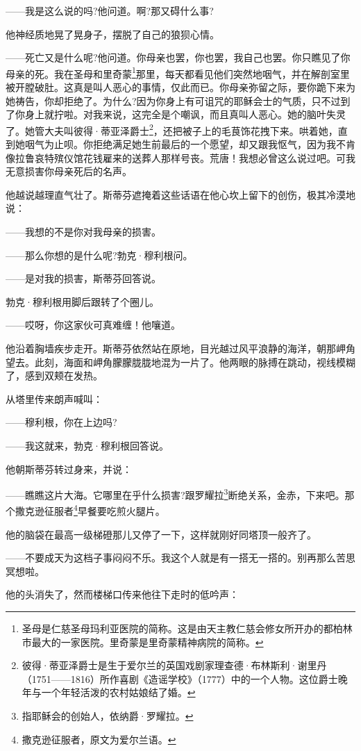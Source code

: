 \par ——我是这么说的吗?他问道。啊?那又碍什么事?
\par 他神经质地晃了晃身子，摆脱了自己的狼狈心情。
\par ——死亡又是什么呢?他问道。你母亲也罢，你也罢，我自己也罢。你只瞧见了你母亲的死。我在圣母和里奇蒙\footnote{圣母是仁慈圣母玛利亚医院的简称。这是由天主教仁慈会修女所开办的都柏林市最大的一家医院。里奇蒙是里奇蒙精神病院的简称。}那里，每天都看见他们突然地咽气，并在解剖室里被开膛破肚。这真是叫人恶心的事情，仅此而已。你母亲弥留之际，要你跪下来为她祷告，你却拒绝了。为什么?因为你身上有可诅咒的耶稣会士的气质，只不过到了你身上就拧啦。对我来说，这完全是个嘲讽，而且真叫人恶心。她的脑叶失灵了。她管大夫叫彼得·蒂亚泽爵士\footnote{彼得·蒂亚泽爵士是生于爱尔兰的英国戏剧家理查德·布林斯利·谢里丹（1751——1816）所作喜剧《造谣学校》（1777）中的一个人物。这位爵士晚年与一个年轻活泼的农村姑娘结了婚。}，还把被子上的毛茛饰花拽下来。哄着她，直到她咽气为止呗。你拒绝满足她生前最后的一个愿望，却又跟我怄气，因为我不肯像拉鲁哀特殡仪馆花钱雇来的送葬人那样号丧。荒唐！我想必曾这么说过吧。可我无意损害你母亲死后的名声。
\par 他越说越理直气壮了。斯蒂芬遮掩着这些话语在他心坎上留下的创伤，极其冷漠地说：
\par ——我想的不是你对我母亲的损害。
\par ——那么你想的是什么呢?勃克·穆利根问。
\par ——是对我的损害，斯蒂芬回答说。
\par 勃克·穆利根用脚后跟转了个圈儿。
\par ——哎呀，你这家伙可真难缠！他嚷道。
\par 他沿着胸墙疾步走开。斯蒂芬依然站在原地，目光越过风平浪静的海洋，朝那岬角望去。此刻，海面和岬角朦朦胧胧地混为一片了。他两眼的脉搏在跳动，视线模糊了，感到双颊在发热。
\par 从塔里传来朗声喊叫：
\par ——穆利根，你在上边吗?
\par ——我这就来，勃克·穆利根回答说。
\par 他朝斯蒂芬转过身来，并说：
\par ——瞧瞧这片大海。它哪里在乎什么损害?跟罗耀拉\footnote{指耶稣会的创始人，依纳爵·罗耀拉。}断绝关系，金赤，下来吧。那个撒克逊征服者\footnote{撒克逊征服者，原文为爱尔兰语。}早餐要吃煎火腿片。
\par 他的脑袋在最高一级梯磴那儿又停了一下，这样就刚好同塔顶一般齐了。
\par ——不要成天为这档子事闷闷不乐。我这个人就是有一搭无一搭的。别再那么苦思冥想啦。
\par 他的头消失了，然而楼梯口传来他往下走时的低吟声：
